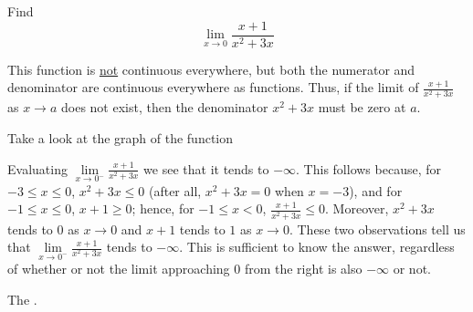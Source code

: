 \documentclass{ximera}
\begin{document}
\begin{question}
  Find 
  \[
  \displaystyle \lim_{x\to0} \frac{x+1}{x^2+3x}
  \]
  \begin{solution}
    \begin{hint}
      This function is \underline{not} continuous everywhere, but both the numerator and denominator are continuous everywhere as functions. Thus, if the limit of $\frac{x+1}{x^2+3x}$ as $x\to a$ does not exist, then the denominator $x^2+3x$ must be zero at $a$.
    \end{hint}
     \begin{hint}
    Take a look at the graph of the function
    \begin{center}
      \end{center}
    \end{hint}
    \begin{hint}
     Evaluating $\lim\limits_{x\to0^{-}}\frac{x+1}{x^2+3x}$ we see that it tends to $-\infty$. This follows because, for $-3\le x\le0$, $x^2+3x\le0$ (after all, $x^2+3x=0$ when $x=-3$), and for $-1\le x\le0$, $x+1\ge0$; hence, for $-1\le x<0$, $\frac{x+1}{x^2+3x}\le0$. Moreover, $x^2+3x$ tends to $0$ as $x\to{0}$ and $x+1$ tends to $1$ as $x\to{0}$. These two observations tell us that  $\lim\limits_{x\to0^{-}}\frac{x+1}{x^2+3x}$ tends to $-\infty$. This is sufficient to know the answer, regardless of whether or not the limit approaching $0$ from the right is also $-\infty$ or not.
    \end{hint}
    The 
    .
  \end{solution}
\end{question}
\end{document}

